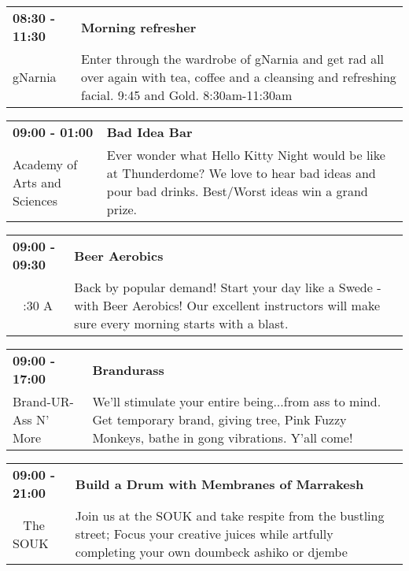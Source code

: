 \begin{tabular}{ p{1in} p{2.2in} }
    \textbf{08:30 - 11:30} & \textbf{Morning refresher} \\
    gNarnia \newline  & Enter through the wardrobe of gNarnia and get rad all over again with tea, coffee and a cleansing and refreshing facial. 9:45 and Gold. 8:30am-11:30am \\
    \hline 
\end{tabular}
    
\begin{tabular}{ p{1in} p{2.2in} }
    \textbf{09:00 - 01:00} & \textbf{Bad Idea Bar} \\
    Academy of Arts and Sciences \newline  & Ever wonder what Hello Kitty Night would be like at Thunderdome? We love to hear bad ideas and pour bad drinks. Best/Worst ideas win a grand prize. \\
    \hline 
\end{tabular}
    
\begin{tabular}{ p{1in} p{2.2in} }
    \textbf{09:00 - 09:30} & \textbf{Beer Aerobics} \\
    ~ \newline 4:30 A & Back by popular demand! Start your day like a Swede - with Beer Aerobics! Our excellent instructors will make sure every morning starts with a blast. \\
    \hline 
\end{tabular}
    
\begin{tabular}{ p{1in} p{2.2in} }
    \textbf{09:00 - 17:00} & \textbf{Brandurass} \\
    Brand-UR-Ass N' More \newline  & We'll stimulate your entire being...from ass to mind. Get temporary brand, giving tree, Pink Fuzzy Monkeys, bathe in gong vibrations. Y'all come! \\
    \hline 
\end{tabular}
    
\begin{tabular}{ p{1in} p{2.2in} }
    \textbf{09:00 - 21:00} & \textbf{Build a Drum with Membranes of Marrakesh} \\
    ~ \newline The SOUK & Join us at the SOUK and take respite from the bustling street; Focus your creative juices while artfully completing your own doumbeck ashiko or djembe \\
    \hline 
\end{tabular}
    
